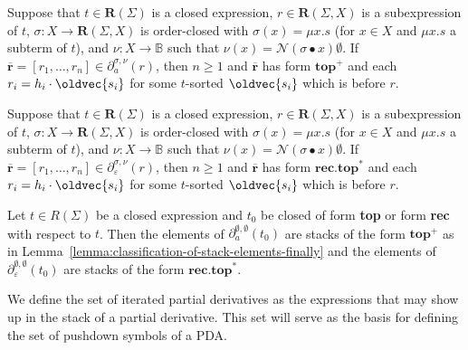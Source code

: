 \documentclass[runningheads, envcountsame, a4paper]{llncs}
\let\vec\oldvec
\newcommand\bool{\mathbb{B}}
\newcommand\pderiv[3][{}]{\partial^{#1}_{#3}(#2)}
\newcommand\Reg{\mathbf{R}}
\newcommand\Null{\mathcal{N}}
\newcommand\RS{\ensuremath{\overline{\mathbf{r}}}}
\newcommand\ApplySubst[2]{#1 \bullet #2} %
\begin{document}
\begin{lemma}\label{lemma:classification-of-stack-elements-finally}
  Suppose that $t \in \Reg (\Sigma)$ is a closed expression, $r \in \Reg (\Sigma,X)$ is a subexpression of
  $t$, $\sigma : X \to \Reg (\Sigma,X)$ is order-closed with $\sigma(x) =
  \mu x.s$ (for $x\in X$ and $\mu x.s$ a subterm of $t$), and $\nu : X \to
  \bool$ such that $\nu (x) = \Null (\ApplySubst\sigma x)\emptyset$. 
  If $\RS = [r_1, \dots, r_n]  \in \pderiv[\sigma,\nu]ra$, then $n\ge1$ and $\RS$ 
  has form $\mathbf{top}^+$ and each $r_i = h_i \cdot \vec{s_i}$ for some $t$-sorted $\vec{s_i}$ which is
  before $r$.
\end{lemma}

\begin{lemma}\label{lemma:classification-of-stack-elements-epsilon}
  Suppose that $t \in \Reg (\Sigma)$ is a closed expression, $r \in \Reg (\Sigma,X)$ is a subexpression of
  $t$, $\sigma : X \to \Reg (\Sigma,X)$ is order-closed with $\sigma(x) =
  \mu x.s$ (for $x\in X$ and $\mu x.s$ a subterm of $t$), and $\nu : X \to
  \bool$ such that  $\nu (x) = \Null (\ApplySubst\sigma x)\emptyset$. 
  If $\RS = [r_1, \dots, r_n]  \in \pderiv[\sigma,\nu]r\varepsilon$, then $n\ge1$ and $\RS$ 
  has form $\mathbf{rec}.\mathbf{top}^*$ and each  $r_i = h_i \cdot \vec{s_i}$ for some $t$-sorted $\vec{s_i}$ which is
  before $r$.
\end{lemma}

\begin{lemma}\label{lemma:closure-form-finally}
  Let $t \in R (\Sigma)$ be a closed expression and $t_0$ be closed of
  form \textup{\textbf{top}} or form \textup{\textbf{rec}} with respect to
  $t$. Then the elements of $\pderiv[\emptyset,\emptyset]{t_0}a$ are stacks  of the form
  $\mathbf{top}^+$ as in 
  Lemma~\ref{lemma:classification-of-stack-elements-finally} and the
  elements of  $\pderiv[\emptyset,\emptyset]{t_0}\varepsilon$ are
  stacks of the form $\mathbf{rec}.\mathbf{top}^*$.
\end{lemma}


We define the set of iterated partial derivatives as the expressions that
may show up in the stack of a partial derivative. This set will serve
as the basis for defining the set of pushdown symbols of a PDA. 
\end{document}
